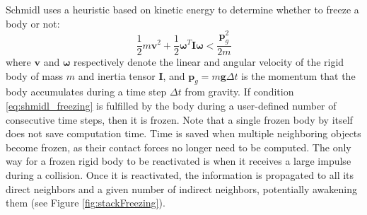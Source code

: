Schmidl \cite{Schmidl2002} uses a heuristic based on kinetic energy to determine whether to freeze a body or not:
\begin{equation}
\label{eq:shmidl_freezing}
\frac{1}{2}m\mathbf{v}^{2} + \frac{1}{2}\mathbf{\omega}^{T}\mathbf{I}\mathbf{\omega} < \frac{\mathbf{p}_{g}^{2}}{2m}
\end{equation}
where $\mathbf{v}$ and $\mathbf{\omega}$ respectively denote the linear and angular velocity of the rigid body of mass $m$ and inertia tensor $\mathbf{I}$, and $\mathbf{p}_{g}=m\mathbf{g}\Delta t$ is the momentum that the body accumulates during a time step $\Delta t$ from gravity.
If condition \eqref{eq:shmidl_freezing} is fulfilled by the body during a user-defined number of consecutive time steps, then it is frozen.
Note that a single frozen body by itself does not save computation time.
Time is saved when multiple neighboring objects become frozen, as their contact forces no longer need to be computed.
The only way for a frozen rigid body to be reactivated is when it receives a large impulse during a collision.
Once it is reactivated, the information is propagated to all its direct neighbors and a given number of indirect neighbors, potentially awakening them (see Figure \ref{fig:stackFreezing}).
